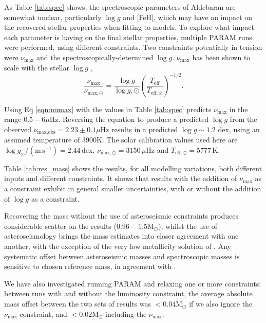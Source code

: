 \documentclass[modern]{aastex61}
\begin{document}
As Table \ref{tab:spec} shows, the spectroscopic parameters of Aldebaran are somewhat unclear, particularly $\log{g}$ and [FeH], which may have an impact on the recovered stellar properties when fitting to models. To explore what impact each parameter is having on the final stellar properties, multiple \textsc{PARAM} runs were performed, using different constraints. Two constraints potentially in tension were $\nu_{\textrm{max}}$ and the spectroscopically-determined $\log{g}$. $\nu_{\textrm{max}}$ has been shown to scale with the stellar $\log{g}$ \citep{Kjeldsen95, 2011A&A...530A.142B},
\begin{equation}
\frac{\nu_{\textrm{max}}}{\nu_{\textrm{max},\odot}}=\frac{\log{g}}{\log{g},\odot}\left(\frac{T_{\textrm{eff}}}{T_{\textrm{eff},\odot}}\right)^{-1/2}.
\label{eqn:numax}
\end{equation}

Using Eq \ref{eqn:numax} with the values in Table \ref{tab:spec} predicts $\nu_{\textrm{max}}$ in the range $0.5-6\mu$Hz. Reversing the equation to produce a predicted $\log{g}$ from the observed $\nu_{\textrm{max,obs}}=2.23\pm0.1\mu$Hz results in a predicted $\log{g}\sim1.2$ dex, using an assumed temperature of 3900K. The solar calibration values used here are $\log g_{\odot} / \left( \mathrm{m} \, \mathrm{s}^{-1}\right)=2.44 \, \mathrm{dex}$, $\nu_{\textrm{max},\odot}=3150\,\mu$Hz and $T_{\textrm{eff},\odot}=5777\,$K.

Table \ref{tab:res_mass} shows the results, for all modelling variations, both different inputs and different constraints. It shows that results with the addition of $\nu_{\textrm{max}}$ as a constraint exhibit in general smaller uncertainties, with or without the addition of $\log{g}$ as a constraint.

Recovering the mass without the use of asteroseismic constraints produces considerable scatter on the results ($0.96-1.5\textrm{M}_{\odot}$), whilst the use of asteroseismology brings the mass estimates into closer agreement with one another, with the exception of the very low metallicity solution of \cite{2008Massarotti}. Any systematic offset between asteroseismic masses and spectroscopic masses is sensitive to chosen reference mass, in agreement with \cite{2017North}.

We have also investigated running \textsc{PARAM} and relaxing one or more constraints: between runs with and without the luminosity constraint, the average absolute mass offset between the two sets of results was $<0.04\textrm{M}_{\odot}$ if we also ignore the $\nu_{\textrm{max}}$ constraint, and $<0.02\textrm{M}_{\odot}$ including the $\nu_{\textrm{max}}$.
\end{document}
